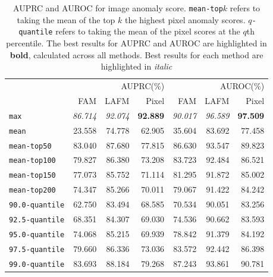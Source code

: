 \begin{table}[htbp]
    \centering
    \begin{adjustbox}{max width=\textwidth}
        \begin{tabular}{lrrrrrr}
        \toprule
        & \multicolumn{3}{r}{AUPRC(\%)} & \multicolumn{3}{r}{AUROC(\%)} \\
        \cmidrule(lr){2-4} \cmidrule(lr){5-7}
        & FAM & LAFM & Pixel & FAM & LAFM & Pixel \\
        \midrule
        \texttt{max} & \textit{86.714} & \textit{92.074} & \textbf{92.889} & \textit{90.017} & \textit{96.589} & \textbf{97.509} \\
        \texttt{mean} & 23.558 & 74.778 & 62.905 & 35.604 & 83.692 & 77.458 \\
        \midrule
        \texttt{mean-top50} & 83.040 & 87.680 & 77.815 & 86.630 & 93.547 & 89.823 \\
        \texttt{mean-top100} & 79.827 & 86.380 & 73.208 & 83.723 & 92.484 & 86.521 \\
        \texttt{mean-top150} & 77.073 & 85.752 & 71.114 & 81.295 & 91.872 & 85.002 \\
        \texttt{mean-top200} & 74.347 & 85.266 & 70.011 & 79.067 & 91.422 & 84.242 \\
        \midrule
        \texttt{90.0-quantile} & 62.750 & 83.494 & 68.585 & 70.534 & 90.051 & 83.256 \\
        \texttt{92.5-quantile} & 68.351 & 84.307 & 69.030 & 74.536 & 90.662 & 83.593 \\
        \texttt{95.0-quantile} & 74.068 & 85.215 & 69.939 & 78.842 & 91.379 & 84.192 \\
        \texttt{97.5-quantile} & 79.660 & 86.336 & 73.036 & 83.572 & 92.442 & 86.398 \\
        \texttt{99.0-quantile} & 83.693 & 88.184 & 79.268 & 87.243 & 93.861 & 90.781 \\
        \bottomrule
        \end{tabular}
    \end{adjustbox}
    \caption[AUPRC and AUROC for image anomaly score]{AUPRC and AUROC for image anomaly score. \texttt{mean-top$k$} refers to taking the mean of the top $k$ the highest pixel anomaly scores. \texttt{$q$-quantile} refers to taking the mean of the pixel scores at the $q$th percentile. The best results for AUPRC and AUROC are highlighted in \textbf{bold}, calculated across all methods. Best results for each method are highlighted in \textit{italic}}
    \label{tab:auprc-auroc-image}
\end{table}


